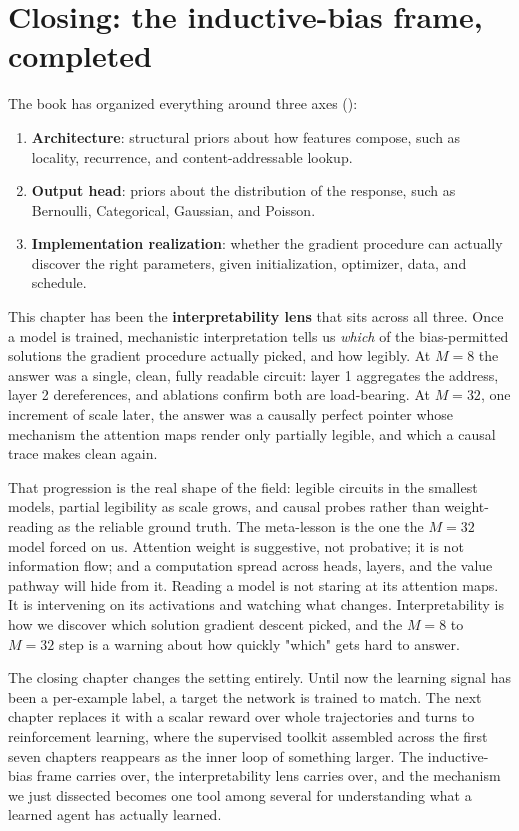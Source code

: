 
\section{Closing: the inductive-bias frame, completed}\label{sec:interp-closing}

The book has organized everything around three axes ():

\begin{enumerate}
\item \textbf{Architecture}: structural priors about how features compose, such
as locality, recurrence, and content-addressable lookup.
\item \textbf{Output head}: priors about the distribution of the response, such
as Bernoulli, Categorical, Gaussian, and Poisson.
\item \textbf{Implementation realization}: whether the gradient procedure can
actually discover the right parameters, given initialization, optimizer, data,
and schedule.
\end{enumerate}

This chapter has been the \textbf{interpretability lens} that sits across all
three. Once a model is trained, mechanistic interpretation tells us \emph{which}
of the bias-permitted solutions the gradient procedure actually picked, and how
legibly. At $M = 8$ the answer was a single, clean, fully readable circuit:
layer 1 aggregates the address, layer 2 dereferences, and ablations confirm both
are load-bearing. At $M = 32$, one increment of scale later, the answer was a
causally perfect pointer whose mechanism the attention maps render only partially
legible, and which a causal trace makes clean again.

That progression is the real shape of the field: legible circuits in the smallest
models, partial legibility as scale grows, and causal probes rather than
weight-reading as the reliable ground truth. The meta-lesson is the one the
$M = 32$ model forced on us. Attention weight is suggestive, not probative; it is
not information flow; and a computation spread across heads, layers, and the
value pathway will hide from it. Reading a model is not staring at its attention
maps. It is intervening on its activations and watching what changes.
Interpretability is how we discover which solution gradient descent picked, and
the $M = 8$ to $M = 32$ step is a warning about how quickly "which" gets hard to
answer.

The closing chapter changes the setting entirely. Until now the learning signal
has been a per-example label, a target the network is trained to match. The next
chapter replaces it with a scalar reward over whole trajectories and turns to
reinforcement learning, where the supervised toolkit assembled across the first
seven chapters reappears as the inner loop of something larger. The
inductive-bias frame carries over, the interpretability lens carries over, and
the mechanism we just dissected becomes one tool among several for understanding
what a learned agent has actually learned.
